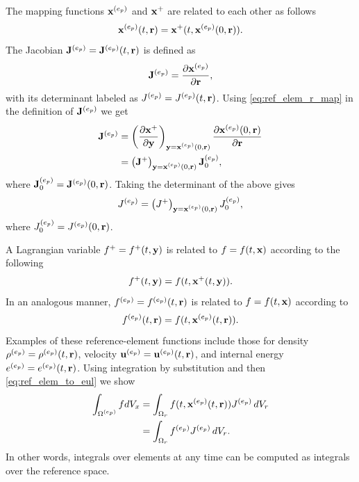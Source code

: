 \documentclass[11pt]{report}
\begin{document}
The mapping functions $\mathbf{x}^{(e_p)}$ and $\mathbf{x}^+$ are related to each other as follows
\begin{equation}
    \label{eq:ref_elem_r_map}
    \mathbf{x}^{(e_p)}(t,\mathbf{r}) = \mathbf{x}^+(t, \mathbf{x}^{(e_p)}(0,\mathbf{r})).
\end{equation}
The Jacobian $\mathbf{J}^{(e_p)} = \mathbf{J}^{(e_p)}(t,\mathbf{r})$ is defined as 
\begin{equation}
    \mathbf{J}^{(e_p)} = \frac{ \partial \mathbf{x}^{(e_p)} }{ \partial \mathbf{r} },
\end{equation}
with its determinant labeled as $J^{(e_p)} = J^{(e_p)}(t,\mathbf{r})$. Using \cref{eq:ref_elem_r_map} in the definition of $\mathbf{J}^{(e_p)}$ we get
\begin{align}
    \mathbf{J}^{(e_p)} &= \left ( \frac{\partial \mathbf{x}^+}{\partial \mathbf{y}} \right )_{\mathbf{y} = \mathbf{x}^{(e_p)}(0,\mathbf{r})} \frac{\partial \mathbf{x}^{(e_p)}(0,\mathbf{r})}{\partial \mathbf{r}} \nonumber \\
    &= \left ( \mathbf{J}^+ \right )_{\mathbf{y} = \mathbf{x}^{(e_p)}(0,\mathbf{r})} \mathbf{J}^{(e_p)}_0,
\end{align}
where $\mathbf{J}^{(e_p)}_0 = \mathbf{J}^{(e_p)}(0,\mathbf{r})$.
Taking the determinant of the above gives
\begin{equation}
    \label{eq:ref_elem_det_J}
    J^{(e_p)} = \left ( J^+ \right )_{\mathbf{y} = \mathbf{x}^{(e_p)}(0,\mathbf{r})} J^{(e_p)}_0,
\end{equation}
where $J^{(e_p)}_0 = J^{(e_p)}(0,\mathbf{r})$.

A Lagrangian variable $f^+=f^+(t,\mathbf{y})$ is related to $f=f(t,\mathbf{x})$ according to the following
\begin{equation}
    f^+(t,\mathbf{y}) = f(t,\mathbf{x}^+(t,\mathbf{y})).
\end{equation}
In an analogous manner, $f^{(e_p)}=f^{(e_p)}(t,\mathbf{r})$ is related to $f=f(t,\mathbf{x})$ according to
\begin{equation}
    \label{eq:ref_elem_to_eul}
    f^{(e_p)}(t,\mathbf{r}) = f(t,\mathbf{x}^{(e_p)}(t,\mathbf{r})).
\end{equation}
Examples of these reference-element functions include those for density $\rho^{(e_p)} = \rho^{(e_p)}(t,\mathbf{r})$, velocity $\mathbf{u}^{(e_p)} = \mathbf{u}^{(e_p)}(t,\mathbf{r})$, and internal energy $e^{(e_p)} = e^{(e_p)}(t,\mathbf{r})$. Using integration by substitution and then \cref{eq:ref_elem_to_eul} we show 
\begin{align}
    \int_{\Omega^{(e_p)}} f dV_x &= \int_{\Omega_r} f(t, \mathbf{x}^{(e_p)}(t,\mathbf{r})) J^{(e_p)} \, dV_r \nonumber \\
    &= \int_{\Omega_r} f^{(e_p)} J^{(e_p)} \, dV_r.
\end{align}
In other words, integrals over elements at any time can be computed as integrals over the reference space. 
\end{document}
